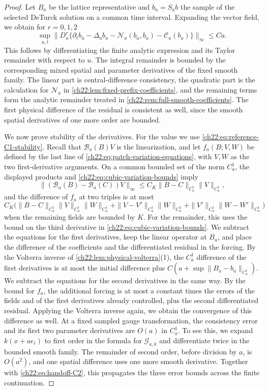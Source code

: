 \begin{proof}
Let $B_a$ be the lattice representative and $b_a=S_ab$ the sample of the selected DeTurck solution on a common time interval. Expanding the vector field, we obtain for $r=0,1,2$
\begin{equation}\label{ch22:eq:twice-differentiated-residual}
 \sup_{u,t}\bigl\|D_u^r\bigl\{\partial_tb_a-\Delta_ab_a-\mathcal N_a(b_a,b_a)-\mathscr C_a(b_a)\bigr\}\bigr\|_\infty\le Ca .
\end{equation}
This follows by differentiating the finite analytic expression and its Taylor remainder with respect to $u$. The integral remainder is bounded by the corresponding mixed spatial and parameter derivatives of the fixed smooth family. The linear part is central-difference consistency, the quadratic part is the calculation for $\mathcal N_a$ in \cref{ch22:lem:fixed-prefix-coefficients}, and the remaining terms form the analytic remainder treated in \cref{ch22:rem:full-smooth-coefficients}. The first physical difference of the residual is consistent as well, since the smooth spatial derivatives of one more order are bounded.

We now prove stability of the derivatives. For the value we use \eqref{ch22:eq:reference-C1-stability}. Recall that $\mathscr B_a(B)V$ is the linearization, and let $f_a(B;V,W)$ be defined by the last line of \eqref{ch22:eq:patch-variation-equations}, with $V,W$ as the two first-derivative arguments. On a common bounded set of the norm $C_a^1$, the displayed products and \eqref{ch22:eq:cubic-variation-bounds} imply
\[
 \|(\mathscr B_a(B)-\mathscr B_a(C))V\|_\infty\le C_K\|B-C\|_{C_a^1}\|V\|_{C_a^1},
\]
and the difference of $f_a$ at two triples is at most
\[
 C_K\bigl(\|B-C\|_{C_a^1}\|V\|_{C_a^1}\|W\|_{C_a^1}+\|V-V'\|_{C_a^1}\|W\|_{C_a^1}+\|V'\|_{C_a^1}\|W-W'\|_{C_a^1}\bigr)
\]
when the remaining fields are bounded by $K$. For the remainder, this uses the bound on the third derivative in \eqref{ch22:eq:cubic-variation-bounds}. We subtract the equations for the first derivatives, keep the linear operator at $B_a$, and place the difference of the coefficients and the differentiated residual in the forcing. By the Volterra inverse of \cref{ch22:lem:physical-volterra}(1), the $C_a^1$ difference of the first derivatives is at most the initial difference plus $C(a+\sup\|B_a-b_a\|_{C_a^1})$. We subtract the equations for the second derivatives in the same way. By the bound for $f_a$, the additional forcing is at most a constant times the errors of the fields and of the first derivatives already controlled, plus the second differentiated residual. Applying the Volterra inverse again, we obtain the convergence of this difference as well. At a fixed sampled gauge transformation, the consistency error and its first two parameter derivatives are $O(a)$ in $C_a^1$. To see this, we expand $k(x+ae_i)$ to first order in the formula for $\mathscr G_{a,k}$ and differentiate twice in the bounded smooth family. The remainder of second order, before division by $a$, is $O(a^2)$, and one spatial difference uses one more smooth derivative. Together with \eqref{ch22:eq:handoff-C2}, this propagates the three error bounds across the finite continuation.


\end{proof}
